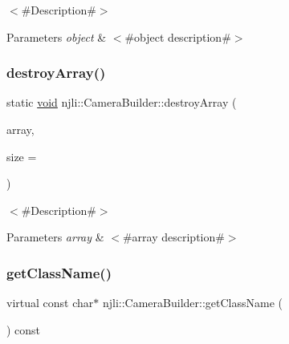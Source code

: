 $<$\#\+Description\#$>$


\begin{DoxyParams}{Parameters}
{\em object} & $<$\#object description\#$>$ \\
\hline
\end{DoxyParams}
\mbox{\label{classnjli_1_1_camera_builder_a026f6adbd0bdf70484ca92dbe37b8d16}} 
\subsubsection{\texorpdfstring{destroy\+Array()}{destroyArray()}}
{\footnotesize\ttfamily static \mbox{\hyperlink{_thread_8h_af1e856da2e658414cb2456cb6f7ebc66}{void}} njli\+::\+Camera\+Builder\+::destroy\+Array (\begin{DoxyParamCaption}\item[{\mbox{\hyperlink{classnjli_1_1_camera_builder}{Camera\+Builder}} $\ast$$\ast$}]{array,  }\item[{const \mbox{\hyperlink{_util_8h_a10e94b422ef0c20dcdec20d31a1f5049}{u32}}}]{size = {} }\end{DoxyParamCaption})\hspace{0.3cm}{\ttfamily [static]}}

$<$\#\+Description\#$>$


\begin{DoxyParams}{Parameters}
{\em array} & $<$\#array description\#$>$ \\
\hline
\end{DoxyParams}
\mbox{\label{classnjli_1_1_camera_builder_a2759f08e605c789e9d06dd2b52ccbaf4}} 
\subsubsection{\texorpdfstring{get\+Class\+Name()}{getClassName()}}
{\footnotesize\ttfamily virtual const char$\ast$ njli\+::\+Camera\+Builder\+::get\+Class\+Name (\begin{DoxyParamCaption}{ }\end{DoxyParamCaption}) const\hspace{0.3cm}{\ttfamily [virtual]}}

